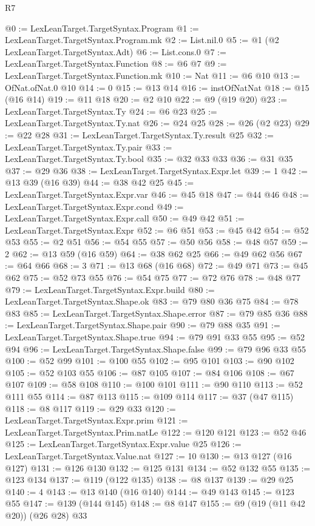 \begin{lexlean}{R7}
\begin{coremodule}
@0 := LexLeanTarget.TargetSyntax.Program
@1 := LexLeanTarget.TargetSyntax.Program.mk
@2 := List.nil.{0}
@5 := @1 (@2 LexLeanTarget.TargetSyntax.Adt)
@6 := List.cons.{0}
@7 := LexLeanTarget.TargetSyntax.Function
@8 := @6 @7
@9 := LexLeanTarget.TargetSyntax.Function.mk
@10 := Nat
@11 := @6 @10
@13 := OfNat.ofNat.{0} @10
@14 := 0
@15 := @13 @14
@16 := instOfNatNat
@18 := @15 (@16 @14)
@19 := @11 @18
@20 := @2 @10
@22 := @9 (@19 @20)
@23 := LexLeanTarget.TargetSyntax.Ty
@24 := @6 @23
@25 := LexLeanTarget.TargetSyntax.Ty.nat
@26 := @24 @25
@28 := @26 (@2 @23)
@29 := @22 @28
@31 := LexLeanTarget.TargetSyntax.Ty.result @25
@32 := LexLeanTarget.TargetSyntax.Ty.pair
@33 := LexLeanTarget.TargetSyntax.Ty.bool
@35 := @32 @33 @33
@36 := @31 @35
@37 := @29 @36
@38 := LexLeanTarget.TargetSyntax.Expr.let
@39 := 1
@42 := @13 @39 (@16 @39)
@44 := @38 @42 @25
@45 := LexLeanTarget.TargetSyntax.Expr.var
@46 := @45 @18
@47 := @44 @46
@48 := LexLeanTarget.TargetSyntax.Expr.cond
@49 := LexLeanTarget.TargetSyntax.Expr.call
@50 := @49 @42
@51 := LexLeanTarget.TargetSyntax.Expr
@52 := @6 @51
@53 := @45 @42
@54 := @52 @53
@55 := @2 @51
@56 := @54 @55
@57 := @50 @56
@58 := @48 @57
@59 := 2
@62 := @13 @59 (@16 @59)
@64 := @38 @62 @25
@66 := @49 @62 @56
@67 := @64 @66
@68 := 3
@71 := @13 @68 (@16 @68)
@72 := @49 @71
@73 := @45 @62
@75 := @52 @73 @55
@76 := @54 @75
@77 := @72 @76
@78 := @48 @77
@79 := LexLeanTarget.TargetSyntax.Expr.build
@80 := LexLeanTarget.TargetSyntax.Shape.ok
@83 := @79 @80 @36 @75
@84 := @78 @83
@85 := LexLeanTarget.TargetSyntax.Shape.error
@87 := @79 @85 @36
@88 := LexLeanTarget.TargetSyntax.Shape.pair
@90 := @79 @88 @35
@91 := LexLeanTarget.TargetSyntax.Shape.true
@94 := @79 @91 @33 @55
@95 := @52 @94
@96 := LexLeanTarget.TargetSyntax.Shape.false
@99 := @79 @96 @33 @55
@100 := @52 @99
@101 := @100 @55
@102 := @95 @101
@103 := @90 @102
@105 := @52 @103 @55
@106 := @87 @105
@107 := @84 @106
@108 := @67 @107
@109 := @58 @108
@110 := @100 @101
@111 := @90 @110
@113 := @52 @111 @55
@114 := @87 @113
@115 := @109 @114
@117 := @37 (@47 @115)
@118 := @8 @117
@119 := @29 @33
@120 := LexLeanTarget.TargetSyntax.Expr.prim
@121 := LexLeanTarget.TargetSyntax.Prim.natLe
@122 := @120 @121
@123 := @52 @46
@125 := LexLeanTarget.TargetSyntax.Expr.value @25
@126 := LexLeanTarget.TargetSyntax.Value.nat
@127 := 10
@130 := @13 @127 (@16 @127)
@131 := @126 @130
@132 := @125 @131
@134 := @52 @132 @55
@135 := @123 @134
@137 := @119 (@122 @135)
@138 := @8 @137
@139 := @29 @25
@140 := 4
@143 := @13 @140 (@16 @140)
@144 := @49 @143
@145 := @123 @55
@147 := @139 (@144 @145)
@148 := @8 @147
@155 := @9 (@19 (@11 @42 @20)) (@26 @28) @33

\end{coremodule}
\end{lexlean}

